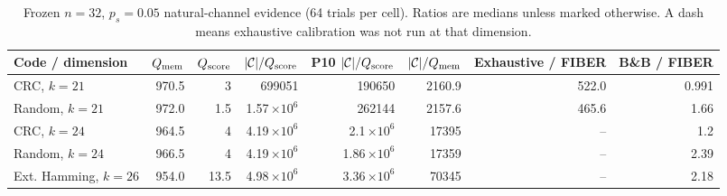 \begin{table}[t]
\caption{Frozen $n=32$, $p_s=0.05$ natural-channel evidence (64 trials per cell). Ratios are medians unless marked otherwise. A dash means exhaustive calibration was not run at that dimension.}
\label{tab:n32}
\centering
\footnotesize
\setlength{\tabcolsep}{3.5pt}
\renewcommand{\arraystretch}{1.12}
\begin{tabular}{@{}lrrrrrrr@{}}
\toprule
Code / dimension & $Q_{\rm mem}$ & $Q_{\rm score}$ & $|\mathcal C|/Q_{\rm score}$ & P10 $|\mathcal C|/Q_{\rm score}$ & $|\mathcal C|/Q_{\rm mem}$ & Exhaustive / FIBER & B\&B / FIBER\\
\midrule
CRC, $k=21$ & 970.5 & 3 & 699051 & 190650 & 2160.9 & 522.0 & 0.991\\
Random, $k=21$ & 972.0 & 1.5 & 1.57\,$\times 10^6$ & 262144 & 2157.6 & 465.6 & 1.66\\
CRC, $k=24$ & 964.5 & 4 & 4.19\,$\times 10^6$ & 2.1\,$\times 10^6$ & 17395 & -- & 1.2\\
Random, $k=24$ & 966.5 & 4 & 4.19\,$\times 10^6$ & 1.86\,$\times 10^6$ & 17359 & -- & 2.39\\
Ext. Hamming, $k=26$ & 954.0 & 13.5 & 4.98\,$\times 10^6$ & 3.36\,$\times 10^6$ & 70345 & -- & 2.18\\
\bottomrule
\end{tabular}
\end{table}
